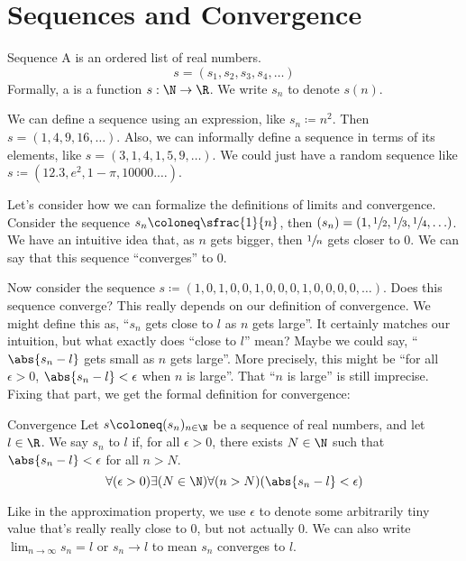 \chapter{Sequences and Convergence}

\begin{dfnbox}{Sequence}{}
    A  is an ordered list of real numbers.
    \[ s = (s_1, s_2, s_3, s_4, \ldots) \]
    \tcblower
    Formally, a  is a function $s : \N \to \R$. We write $s_n$ to denote $s(n)$.
\end{dfnbox}

We can define a sequence using an expression, like $s_n \coloneq n^2$. Then $s = (1,4,9,16,\ldots)$. Also, we can informally define a sequence in terms of its elements, like $s = (3,1,4,1,5,9,\ldots)$. We could just have a random sequence like $s \coloneq (12.3, e^2, 1 - \pi, 10000. \ldots)$.

Let's consider how we can formalize the definitions of limits and convergence. Consider the sequence $s_n \coloneq \sfrac{1}{n}$, then $(s_n) = \left( 1, \sfrac12, \sfrac13, \sfrac14, \ldots \right)$. We have an intuitive idea that, as $n$ gets bigger, then $\sfrac{1}{n}$ gets closer to $0$. We can say that this sequence ``converges'' to $0$.

Now consider the sequence $s \coloneq (1,0,1,0,0,1,0,0,0,1,0,0,0,0,\ldots)$. Does this sequence converge? This really depends on our definition of convergence. We might define this as, ``$s_n$ gets close to $l$ as $n$ gets large''. It certainly matches our intuition, but what exactly does ``close to $l$'' mean? Maybe we could say, ``$\abs{s_n - l}$ gets small as $n$ gets large''. More precisely, this might be ``for all $\epsilon > 0$, $\abs{s_n -l} < \epsilon$ when $n$ is large''. That ``$n$ is large'' is still imprecise. Fixing that part, we get the formal definition for convergence:

\begin{dfnbox}{Convergence}{}
    Let $s \coloneq (s_n)_{n\in\N}$ be a sequence of real numbers, and let $l \in \R$. We say $s_n$  to $l$ if, for all $\epsilon > 0$, there exists $N \in \N$ such that $\abs{s_n - l} < \epsilon$ for all $n > N$.
    \tcblower
    \[ \forall(\epsilon > 0) \exists(N \in \N) \forall (n > N) (\abs{s_n - l} < \epsilon) \]
\end{dfnbox}

Like in the approximation property, we use $\epsilon$ to denote some arbitrarily tiny value that's really really close to $0$, but not actually $0$. We can also write $\lim_{n \to \infty} s_n = l$ or $s_n \to l$ to mean $s_n$ converges to $l$.

